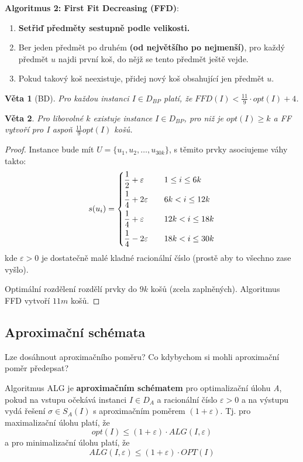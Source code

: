 \documentclass[11pt]{report} %
\newtheorem{theorem}{Věta}[section]
\numberwithin{equation}{section}
\begin{document}
\medskip
\noindent\textbf{Algoritmus 2: First Fit Decreasing (FFD)}: 
\begin{enumerate}
	
	
	\item \textbf{Setřiď předměty sestupně podle velikosti.} 
	\item Ber jeden předmět po druhém \textbf{(od největšího po nejmenší)}, pro každý předmět $u$ najdi první koš, do nějž se tento předmět ještě vejde.
	\item Pokud takový koš neexistuje, přidej nový koš obsahující jen předmět $u$.  
\end{enumerate}

\begin{theorem}[BD]
	Pro každou instanci $I \in D_{BP}$ platí, že $FFD(I) < \frac{11}{9} \cdot opt(I) + 4$.
\end{theorem}
\begin{theorem}
	Pro libovolné $k$ existuje instance $I \in D_{BP}$, pro niž je $opt(I) \geq k$ a FF vytvoří pro I aspoň $\frac{11}{9}opt(I)$ košů.
\end{theorem}
\begin{proof}
	Instance bude mít $U = \{u_1, u_2, \dots, u_{30k}\}$, s těmito prvky asociujeme váhy takto:
	$$
	s(u_i) =
	\begin{dcases}
	\frac{1}{2} + \varepsilon 	&\quad 1 \leq i \leq 6k\\
	\frac{1}{4} + 2\varepsilon 	&\quad 6k < i \leq 12k	\\
	\frac{1}{4} + \varepsilon 	&\quad 12k < i \leq 18k \\
	\frac{1}{4} - 2\varepsilon 	&\quad 18k < i \leq 30k \\
	\end{dcases}
	$$
	kde $\varepsilon > 0$ je dostatečně malé kladné racionální číslo (prostě aby to všechno zase vyšlo).
	
	Optimální rozdělení rozdělí prvky do $9k$ košů (zcela zaplněných). Algoritmus FFD vytvoří $11m$ košů.
\end{proof}


\subsection{Aproximační schémata}
Lze dosáhnout  aproximačního poměru? Co kdybychom si mohli aproximační poměr předepsat?

Algoritmus ALG je \textbf{aproximačním schématem} pro optimalizační úlohu \textit{A}, pokud na vstupu očekává instanci
$I \in D_A$ a racionální číslo $\varepsilon > 0$ a na výstupu vydá řešení $\sigma \in S_A(I)$ s aproximačním poměrem $(1 + \varepsilon)$. Tj. pro maximalizační úlohu platí, že 
$$opt(I) \leq (1 + \varepsilon) \cdot ALG(I, \varepsilon)$$
a pro minimalizační úlohu platí, že
$$ALG(I, \varepsilon) \leq (1 + \varepsilon) \cdot OPT(I)$$
\end{document}
